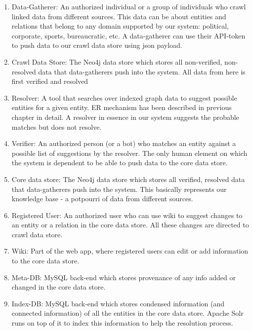 \begin{enumerate}
    
    \item Data-Gatherer: An authorized individual or a group of individuals who crawl linked data from different sources. This data can be about entities and relations that belong to any domain supported by our system: political, corporate, sports, bureaucratic, etc. A data-gatherer can use their API-token to push data to our crawl data store using json payload.

    \item Crawl Data Store: The Neo4j data store which stores all non-verified, non-resolved data that data-gatherers push into the system. All data from here is first verified and resolved  

    \item Resolver: A tool that searches over indexed graph data to suggest possible entities for a given entity. ER mechanism has been described in previous chapter in detail. A resolver in essence in our system suggests the probable matches but does not resolve.

    \item Verifier: An authorized person (or a bot) who matches an entity against a possible list of suggestions by the resolver. The only human element on which the system is dependent to be able to push data to the core data store.

    \item Core data store: The Neo4j data store which stores all verified, resolved data that data-gatherers push into the system.  This basically represents our knowledge base - a potpourri of data from different sources.

    \item Registered User: An authorized user who can use wiki to suggest changes to an entity or a relation in the core data store. All these changes are directed to crawl data store.   

    \item Wiki: Part of the web app, where registered users can edit or add information to the core data store.

    \item Meta-DB: MySQL back-end which stores provenance of any info added or changed in the core data store.

    \item Index-DB: MySQL back-end which stores condensed information (and connected information) of all the entities in the core data store. Apache Solr runs on top of it to index this information to help the resolution process. 


\end{enumerate}

